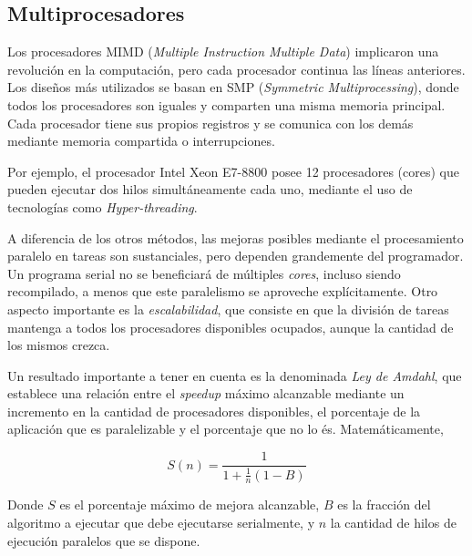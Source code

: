\subsection{Multiprocesadores}

Los procesadores MIMD (\textit{Multiple Instruction Multiple Data}) implicaron una revoluci\'on en la computaci\'on, pero
cada procesador continua las l\'ineas anteriores.  Los dise\~nos m\'as utilizados se basan en SMP (\textit{Symmetric
Multiprocessing}), donde todos los procesadores son iguales y comparten una misma memoria principal. Cada procesador tiene
sus propios registros y se comunica con los dem\'as mediante memoria compartida o interrupciones.

Por ejemplo, el procesador Intel Xeon E7-8800 posee 12 procesadores (cores) que pueden ejecutar dos hilos simult\'aneamente
cada uno, mediante el uso de tecnolog\'ias como \textit{Hyper-threading}.

A diferencia de los otros m\'etodos, las mejoras posibles mediante el procesamiento paralelo en tareas son sustanciales,
pero dependen grandemente del programador. Un programa serial no se beneficiar\'a de m\'ultiples \textit{cores},
incluso siendo recompilado, a menos que este paralelismo se aproveche expl\'icitamente. Otro aspecto importante es la
\textit{escalabilidad}, que consiste en que la divisi\'on de tareas mantenga a todos los procesadores disponibles ocupados,
aunque la cantidad de los mismos crezca.

Un resultado importante a tener en cuenta es la denominada \textit{Ley de Amdahl}, que establece una relaci\'on entre
el \textit{speedup} m\'aximo alcanzable mediante un incremento en la cantidad de procesadores disponibles, el porcentaje
de la aplicaci\'on que es paralelizable y el porcentaje que no lo \'es. Matem\'aticamente,

\begin{equation}
    \label{eq:amdahl}
    S(n) = \frac{1}{1 + \frac{1}{n} (1 - B)}
\end{equation}

Donde $S$ es el porcentaje m\'aximo de mejora alcanzable, $B$ es la fracci\'on del algoritmo a ejecutar que debe ejecutarse
serialmente, y $n$ la cantidad de hilos de ejecuci\'on paralelos que se dispone.

